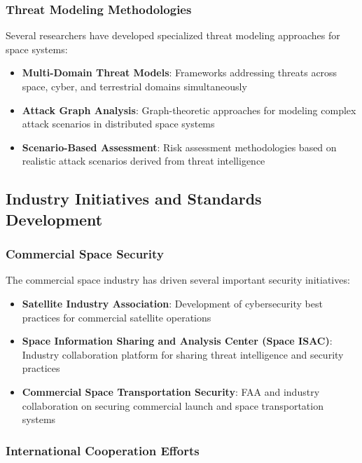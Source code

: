 \documentclass[binding=0.6cm]{sapthesis}
\begin{document}
\subsubsection{Threat Modeling Methodologies}

Several researchers have developed specialized threat modeling approaches for space systems:

\begin{itemize}
    \item \textbf{Multi-Domain Threat Models}: Frameworks addressing threats across space, cyber, and terrestrial domains simultaneously
    \item \textbf{Attack Graph Analysis}: Graph-theoretic approaches for modeling complex attack scenarios in distributed space systems
    \item \textbf{Scenario-Based Assessment}: Risk assessment methodologies based on realistic attack scenarios derived from threat intelligence
\end{itemize}

\subsection{Industry Initiatives and Standards Development}

\subsubsection{Commercial Space Security}

The commercial space industry has driven several important security initiatives:

\begin{itemize}
    \item \textbf{Satellite Industry Association}: Development of cybersecurity best practices for commercial satellite operations
    \item \textbf{Space Information Sharing and Analysis Center (Space ISAC)}: Industry collaboration platform for sharing threat intelligence and security practices
    \item \textbf{Commercial Space Transportation Security}: FAA and industry collaboration on securing commercial launch and space transportation systems
\end{itemize}

\subsubsection{International Cooperation Efforts}
\end{document}
